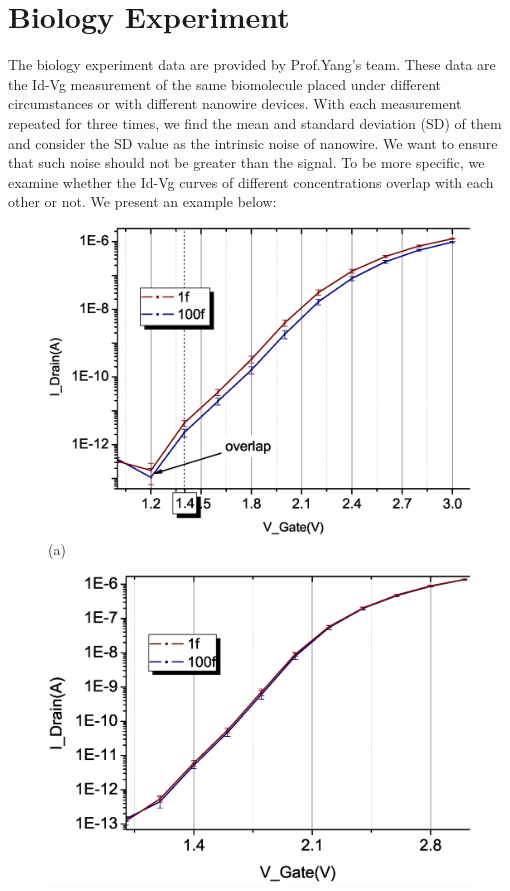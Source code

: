 \section{Biology Experiment}
The biology experiment data are provided by Prof.Yang's team.
These data are the Id-Vg measurement of the same biomolecule placed under different circumstances or with different nanowire devices.
With each measurement repeated for three times, we find the mean and standard deviation (SD) of them and consider the SD value as the intrinsic noise of nanowire.
We want to ensure that such noise should not be greater than the signal.
To be more specific, we examine whether the Id-Vg curves of different concentrations overlap with each other or not.
We present an example below:
\begin{figure}[!htbp]
    \centering
    \begin{minipage}[t]{1\textwidth}
        \centering
        \includegraphics[scale=0.4]{images/chapter3/208_devices/L2-8_log.eps}
        (a)
    \end{minipage}
    \vfill
    \begin{minipage}[t]{1\textwidth}
        \centering
        \includegraphics[scale=0.4]{images/chapter3/208_devices/L2-10_log.eps}

\end{minipage}
\end{figure}
